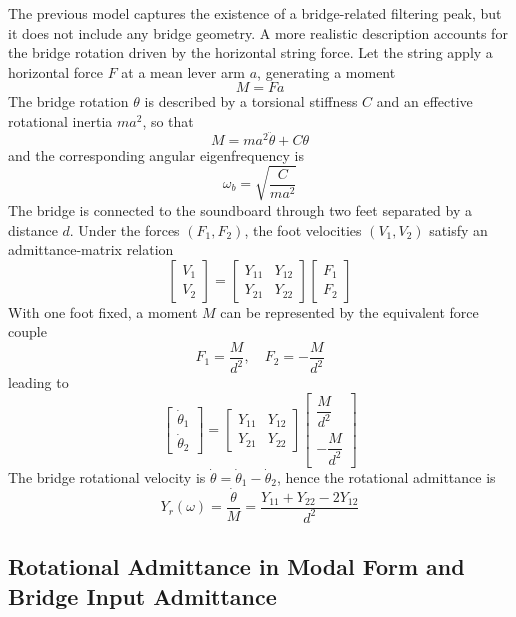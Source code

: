 The previous model captures the existence of a bridge-related filtering peak, but it does not include any bridge geometry. A more realistic description accounts for the bridge rotation driven by the horizontal string force. Let the string apply a horizontal force \( F \) at a mean lever arm \( a \), generating a moment
\[
M = Fa
\]
The bridge rotation \( \theta \) is described by a torsional stiffness \( C \) and an effective rotational inertia \( ma^{2} \), so that
\[
M = ma^{2}\ddot{\theta}+C\theta
\]
and the corresponding angular eigenfrequency is
\[
\omega_b = \sqrt{\frac{C}{ma^{2}}}
\]
The bridge is connected to the soundboard through two feet separated by a distance \( d \). Under the forces \( (F_1,F_2) \), the foot velocities \( (V_1,V_2) \) satisfy an admittance-matrix relation
\[
\begin{bmatrix}
V_1 \\
V_2
\end{bmatrix}
 = 
\begin{bmatrix}
Y_{11} & Y_{12} \\
Y_{21} & Y_{22}
\end{bmatrix}
\begin{bmatrix}
F_1 \\
F_2
\end{bmatrix}
\]
With one foot fixed, a moment \( M \) can be represented by the equivalent force couple
\[
F_1 = \frac{M}{d^{2}}, \quad F_2 = -\frac{M}{d^{2}}
\]
leading to
\[
\begin{bmatrix}
\dot{\theta}_1 \\
\dot{\theta}_2
\end{bmatrix}
 = 
\begin{bmatrix}
Y_{11} & Y_{12} \\
Y_{21} & Y_{22}
\end{bmatrix}
\begin{bmatrix}
\dfrac{M}{d^{2}} \\
-\dfrac{M}{d^{2}}
\end{bmatrix}
\]
The bridge rotational velocity is \( \dot{\theta} = \dot{\theta}_1-\dot{\theta}_2 \), hence the rotational admittance is
\[
Y_r(\omega) = \frac{\dot{\theta}}{M} = \frac{Y_{11}+Y_{22}-2Y_{12}}{d^{2}}
\]

\subsection{Rotational Admittance in Modal Form and Bridge Input Admittance}

